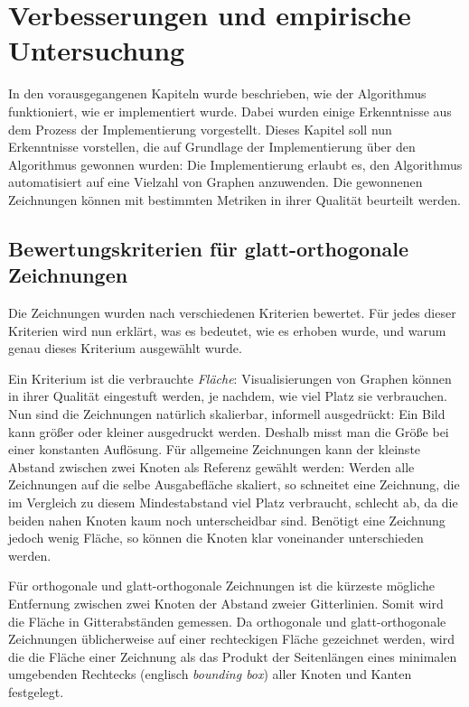 \documentclass[a4paper]{scrreprt}
\theoremstyle{definition}
\begin{document}

\chapter{Verbesserungen und empirische Untersuchung}

In den vorausgegangenen Kapiteln wurde beschrieben, wie der Algorithmus funktioniert, wie er implementiert wurde. Dabei wurden einige Erkenntnisse aus dem Prozess der Implementierung vorgestellt. Dieses Kapitel soll nun Erkenntnisse vorstellen, die auf Grundlage der Implementierung über den Algorithmus gewonnen wurden: Die Implementierung erlaubt es, den Algorithmus automatisiert auf eine Vielzahl von Graphen anzuwenden. Die gewonnenen Zeichnungen können mit bestimmten Metriken in ihrer Qualität beurteilt werden.

\section{Bewertungskriterien für glatt-orthogonale Zeichnungen}

Die Zeichnungen wurden nach verschiedenen Kriterien bewertet. Für jedes dieser Kriterien wird nun erklärt, was es bedeutet, wie es erhoben wurde, und warum genau dieses Kriterium ausgewählt wurde.

Ein Kriterium ist die verbrauchte \emph{Fläche}: Visualisierungen von Graphen können in ihrer Qualität eingestuft werden, je nachdem, wie viel Platz sie verbrauchen. Nun sind die Zeichnungen natürlich skalierbar, informell ausgedrückt: Ein Bild kann größer oder kleiner ausgedruckt werden. Deshalb misst man die Größe bei einer konstanten Auflösung. Für allgemeine Zeichnungen kann der kleinste Abstand zwischen zwei Knoten als Referenz gewählt werden: Werden alle Zeichnungen auf die selbe Ausgabefläche skaliert, so schneitet eine Zeichnung, die im Vergleich zu diesem Mindestabstand viel Platz verbraucht, schlecht ab, da die beiden nahen Knoten kaum noch unterscheidbar sind. Benötigt eine Zeichnung jedoch wenig Fläche, so können die Knoten klar voneinander unterschieden werden.

Für orthogonale und glatt-orthogonale Zeichnungen ist die kürzeste mögliche Entfernung zwischen zwei Knoten der Abstand zweier Gitterlinien. Somit wird die Fläche in Gitterabständen gemessen. Da orthogonale und glatt-orthogonale Zeichnungen üblicherweise auf einer rechteckigen Fläche gezeichnet werden, wird die die Fläche einer Zeichnung als das Produkt der Seitenlängen eines minimalen umgebenden Rechtecks (englisch \emph{bounding box}) aller Knoten und Kanten festgelegt.
\end{document}
